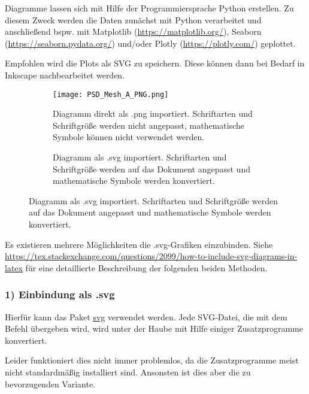 Diagramme lassen sich mit Hilfe der Programmiersprache Python erstellen. Zu diesem Zweck werden die Daten zunächst mit Python verarbeitet und anschließend bspw. mit Matplotlib (\url{https://matplotlib.org/}), Seaborn (\url{https://seaborn.pydata.org/}) und/oder Plotly (\url{https://plotly.com/}) geplottet.

Empfohlen wird die Plots als \gls{SVG} zu speichern. Diese können dann bei Bedarf in Inkscape nachbearbeitet werden. 

\begin{figure}[ht]
    \begin{footnotesize}
    	\centering
    	\begin{subfigure}[b]{0.45\textwidth}
    		\centering
    		\texttt{[image: PSD\_Mesh\_A\_PNG.png]}
    		\caption{%
    		    Diagramm direkt als .png importiert. Schriftarten und Schriftgröße werden nicht angepasst, mathematische Symbole können nicht verwendet werden.
    		}
    		\label{fig:png_import}
    	\end{subfigure}
    	\hspace{0.05\textwidth}
    	\begin{subfigure}[b]{0.45\textwidth}
    		\centering
    		
    		\caption{%
    		    Diagramm als .svg importiert. Schriftarten und Schriftgröße werden auf das Dokument angepasst und mathematische Symbole werden konvertiert.
    		}
    		\label{fig:svg_import}
    	\end{subfigure}
    \end{footnotesize}
\end{figure}

Es existieren mehrere Möglichkeiten die .svg-Grafiken einzubinden. Siehe \url{https://tex.stackexchange.com/questions/2099/how-to-include-svg-diagrams-in-latex} für eine detaillierte Beschreibung der folgenden beiden Methoden. 

\subsubsection{1) Einbindung als .svg}

Hierfür kann das Paket \href{https://www.ctan.org/tex-archive/graphics/svg}{svg} verwendet werden. Jede SVG-Datei, die mit dem Befehl \verb!! übergeben wird, wird unter der Haube mit Hilfe einiger Zusatzprogramme konvertiert.

Leider funktioniert dies nicht immer problemlos, da die Zusatzprogramme meist nicht standardmäßig installiert sind. Ansonsten ist dies aber die zu bevorzugenden Variante.


